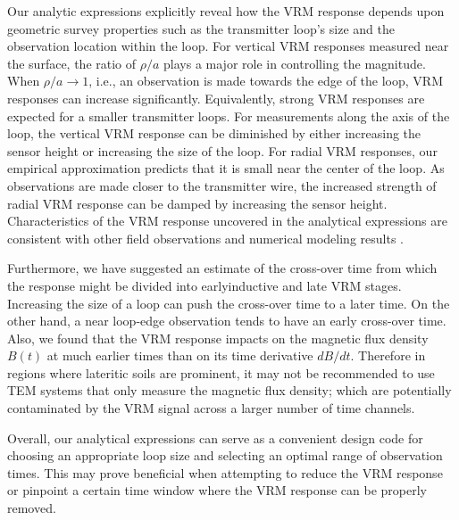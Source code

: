 \documentclass[onecolumn]{IEEEtran} %
\begin{document}
Our analytic expressions explicitly reveal how the VRM response depends upon geometric survey properties such as the transmitter loop's size and the observation location within the loop. For vertical VRM responses measured near the surface, the ratio of $\rho/a$ plays a major role in controlling the magnitude. When $\rho/a \rightarrow 1$, i.e., an observation is made towards the edge of the loop, VRM responses can increase significantly. Equivalently, strong VRM responses are expected for a smaller transmitter loops. For measurements along the axis of the loop, the vertical VRM response  can be diminished by either increasing the sensor height or increasing the size of the loop. For radial VRM responses, our empirical approximation predicts that it is small near the center of the loop. As observations are made closer to the transmitter wire, the increased strength of radial VRM response can be damped by increasing the sensor height. Characteristics of the VRM response uncovered in the analytical expressions are consistent with other field observations and numerical modeling results \cite{Buselli1982, Barsukov2001, Billings2003, Kozhevnikov2007,Pasion2007, Zadorozhnaya2012}.

Furthermore, we have suggested an estimate of the cross-over time from which the response might be divided into earlyinductive and late VRM stages. Increasing the size of a loop can push the cross-over time to a later time. On the other hand, a near loop-edge observation tends to have an early cross-over time. Also, we found that the VRM response impacts on the magnetic flux density $B(t)$ at much earlier times than on its time derivative $dB/dt$. Therefore in regions where lateritic soils are prominent, it may not be recommended to use TEM systems that only measure the magnetic flux density; which are potentially contaminated by the VRM signal across a larger number of time channels.

Overall, our analytical expressions can serve as a convenient design code for choosing an appropriate loop size and selecting an optimal range of observation times. This may prove beneficial when attempting to reduce the VRM response or pinpoint a certain time window where the VRM response can be properly removed.



\end{document}
